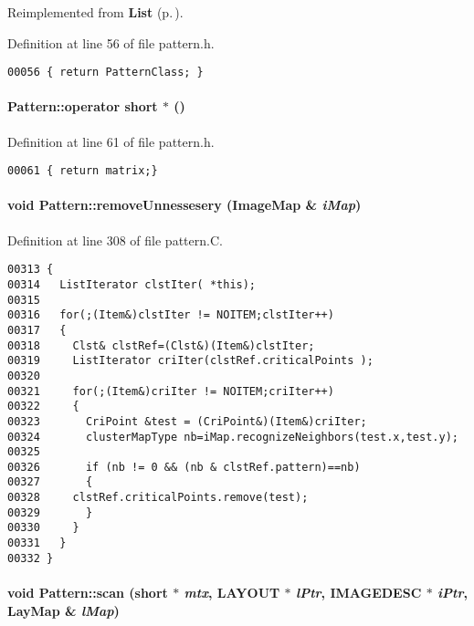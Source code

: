 Reimplemented from {\bf List} {\rm (p.\,\pageref{List_a6})}.

Definition at line 56 of file pattern.h.\small\begin{verbatim}00056 { return PatternClass; }
\end{verbatim}\normalsize 
\label{Pattern_a5}
\paragraph{\setlength{\rightskip}{0pt plus 5cm}Pattern::operator short $\ast$ ()\hspace{0.3cm}{\tt  [inline]}}\hfill



Definition at line 61 of file pattern.h.\small\begin{verbatim}00061 { return matrix;}
\end{verbatim}\normalsize 
\label{Pattern_a7}
\paragraph{\setlength{\rightskip}{0pt plus 5cm}void Pattern::remove\-Unnessesery ({\bf Image\-Map} \& {\em i\-Map})}\hfill



Definition at line 308 of file pattern.C.\small\begin{verbatim}00313 {
00314   ListIterator clstIter( *this);
00315 
00316   for(;(Item&)clstIter != NOITEM;clstIter++)
00317   {
00318     Clst& clstRef=(Clst&)(Item&)clstIter;
00319     ListIterator criIter(clstRef.criticalPoints );
00320 
00321     for(;(Item&)criIter != NOITEM;criIter++)
00322     {
00323       CriPoint &test = (CriPoint&)(Item&)criIter;
00324       clusterMapType nb=iMap.recognizeNeighbors(test.x,test.y);
00325       
00326       if (nb != 0 && (nb & clstRef.pattern)==nb)
00327       {
00328     clstRef.criticalPoints.remove(test);
00329       }
00330     }
00331   }
00332 }
\end{verbatim}\normalsize 
\label{Pattern_c0}
\paragraph{\setlength{\rightskip}{0pt plus 5cm}void Pattern::scan (short $\ast$ {\em mtx}, LAYOUT $\ast$ {\em l\-Ptr}, {\bf IMAGEDESC} $\ast$ {\em i\-Ptr}, {\bf Lay\-Map} \& {\em l\-Map})\hspace{0.3cm}{\tt  [private]}}\hfill



